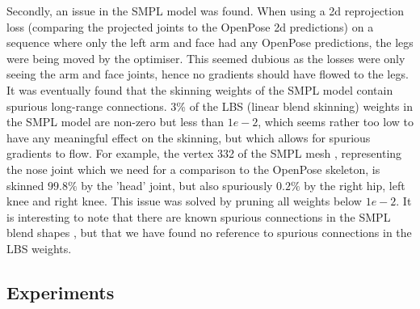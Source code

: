 Secondly, an issue in the SMPL model was found. When using a 2d reprojection loss (comparing the projected joints to the OpenPose 2d predictions) on a sequence where only the left arm and face had any OpenPose predictions, the legs were being moved by the optimiser. This seemed dubious as the losses were only seeing the arm and face joints, hence no gradients should have flowed to the legs. It was eventually found that the skinning weights of the SMPL model \cite{SMPL} contain spurious long-range connections. 3\% of the LBS (linear blend skinning) weights in the SMPL model are non-zero but less than $1e-2$, which seems rather too low to have any meaningful effect on the skinning, but which allows for spurious gradients to flow. For example, the vertex 332 of the SMPL mesh \cite{SMPL_op_joints}, representing the nose joint which we need for a comparison to the OpenPose skeleton, is skinned $99.8\%$ by the 'head' joint, but also spuriously $0.2\%$ by the right hip, left knee and right knee. This issue was solved by pruning all weights below $1e-2$. It is interesting to note that there are known spurious connections in the SMPL blend shapes \cite{STAR}, but that we have found no reference to spurious connections in the LBS weights. 
\\













\subsection{Experiments}

